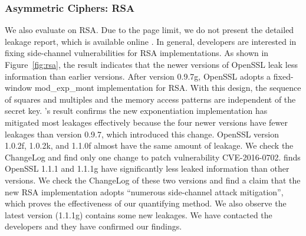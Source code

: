 \subsubsection{Asymmetric Ciphers: RSA}\label{eval:asym}
We also evaluate \tool{} on RSA. Due to the page limit,
we do not present the detailed leakage report, which is available online . In general,
developers are interested in fixing side-channel vulnerabilities for RSA implementations.
As shown in Figure~\ref{fig:rsa}, the result indicates that the newer
versions of OpenSSL leak less information than earlier
versions. After version 0.9.7g, OpenSSL adopts a fixed-window \textsf{mod\_exp\_mont}
implementation for RSA\@. With this design, the sequence of squares and
multiples and the memory access patterns are independent of the secret key.
\tool{}'s result confirms the new exponentiation implementation has mitigated 
most leakages effectively because the four newer versions have fewer
leakages than version 0.9.7, which introduced this change.
OpenSSL version 1.0.2f, 1.0.2k, and 1.1.0f almost have the
same amount of leakage. We check the ChangeLog and find only one change to
patch vulnerability CVE-2016-0702. 
\tool{} finds OpenSSL 1.1.1 and 1.1.1g have significantly less
leaked information than other versions.
We check the ChangeLog of these two versions and find a claim that
the new RSA implementation adopts ``numerous side-channel attack mitigation'', 
which proves the effectiveness of our quantifying method.
We also observe the latest version (1.1.1g) contains some new leakages. We have
contacted the developers and they have confirmed our findings.

